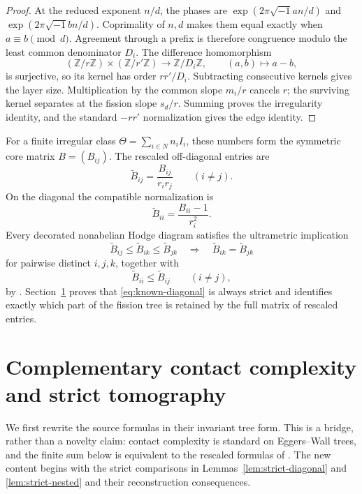 \documentclass[11pt,a4paper]{amsart}
\theoremstyle{plain}
\theoremstyle{definition}
\newcommand{\ZZ}{\mathbb Z}
\begin{document}
\begin{proof}
At the reduced exponent $n/d$, the phases are
$\exp(2\pi\sqrt{-1}an/d)$ and $\exp(2\pi\sqrt{-1}bn/d)$.  Coprimality of $n,d$ makes them equal
exactly when $a\equiv b\pmod d$.  Agreement through a prefix is therefore congruence modulo the
least common denominator $D_i$.  The difference homomorphism
\[
 (\ZZ/r\ZZ)\times(\ZZ/r'\ZZ)\longrightarrow\ZZ/D_i\ZZ,
 \qquad(a,b)\longmapsto a-b,
\]
is surjective, so its kernel has order $rr'/D_i$.  Subtracting consecutive kernels gives the layer
size.  Multiplication by the common slope $m_i/r$ cancels $r$; the surviving kernel separates at
the fission slope $s_d/r$.  Summing proves the irregularity identity, and the standard
$-rr'$ normalization gives the edge identity.
\end{proof}

For a finite irregular class $\Theta=\sum_{i\in N}n_iI_i$, these numbers form the symmetric core
matrix $B=(B_{ij})$.  The rescaled off-diagonal entries are
\begin{equation}\label{eq:rescaled}
 \widetilde B_{ij}=\frac{B_{ij}}{r_ir_j}\qquad(i\ne j).
\end{equation}
On the diagonal the compatible normalization is
\begin{equation}\label{eq:rescaled-diagonal}
 \widetilde B_{ii}=\frac{B_{ii}-1}{r_i^2}.
\end{equation}
Every decorated nonabelian Hodge diagram satisfies the ultrametric implication
\begin{equation}\label{eq:known-ultra}
 \widetilde B_{ij}\le\widetilde B_{ik}\le\widetilde B_{jk}
 \quad\Longrightarrow\quad
 \widetilde B_{ik}=\widetilde B_{jk}
\end{equation}
for pairwise distinct $i,j,k$, together with
\begin{equation}\label{eq:known-diagonal}
 \widetilde B_{ii}\le \widetilde B_{ij}\qquad(i\ne j),
\end{equation}
by \cite[Theorem~4.2]{Doucot2025Graphs}.  Section~\ref{sec:contact} proves that
\eqref{eq:known-diagonal} is always strict and identifies exactly which part of the fission tree is
retained by the full matrix of rescaled entries.

\section{Complementary contact complexity and strict tomography}\label{sec:contact}

We first rewrite the source formulas in their invariant tree form.  This is a bridge, rather than a
novelty claim: contact complexity is standard on Eggers--Wall trees, and the finite sum below is
equivalent to the rescaled formulas of \cite[Lemma~4.3]{Doucot2025Graphs}.  The new content begins
with the strict comparisons in Lemmas~\ref{lem:strict-diagonal} and
\ref{lem:strict-nested} and their reconstruction consequences.
\end{document}
